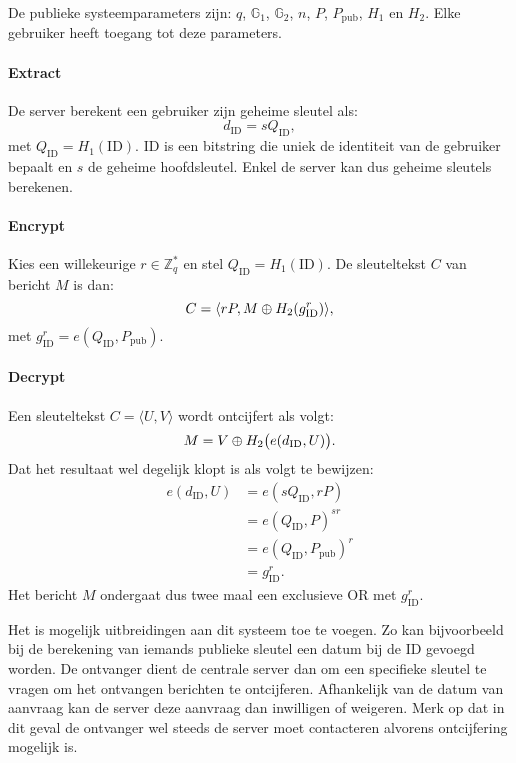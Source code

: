De publieke systeemparameters zijn: $q$, $\mathbb{G}_1$, $\mathbb{G}_2$, $n$, $P$, $P_{\text{pub}}$, $H_1$ en $H_2$. Elke gebruiker heeft toegang tot deze parameters.

\paragraph{Extract} De server berekent een gebruiker zijn geheime sleutel als:
\[d_{\text{ID}} = s Q_{\text{ID}},\]
met $Q_{\text{ID}} = H_1(\text{ID})$. ID is een bitstring die uniek de identiteit van de gebruiker bepaalt en $s$ de geheime hoofdsleutel. Enkel de server kan dus geheime sleutels berekenen.

\paragraph{Encrypt} Kies een willekeurige $r \in \mathbb{Z}_q^*$ en stel $Q_{\text{ID}} = H_1(\text{ID})$. De sleuteltekst $C$ van bericht $M$ is dan:
\[C = \langle rP, M \oplus H_2(g_{\text{ID}}^r) \rangle,\]
met $g_{\text{ID}}^r = e(Q_{\text{ID}}, P_{\text{pub}})$.

\paragraph{Decrypt} Een sleuteltekst $C = \langle U, V \rangle$ wordt ontcijfert als volgt:
\[M = V \oplus H_2\big( e(d_{\text{ID}}, U) \big).\]
Dat het resultaat wel degelijk klopt is als volgt te bewijzen:
\[\begin{aligned}
e(d_{\text{ID}}, U)	&= e(sQ_{\text{ID}}, rP)\\
							&= e(Q_{\text{ID}}, P)^{sr}\\
							&= e(Q_{\text{ID}}, P_{\text{pub}})^r\\
							&= g_{\text{ID}}^r.
\end{aligned}\]
Het bericht $M$ ondergaat dus twee maal een exclusieve OR met $g_{\text{ID}}^r$.

Het is mogelijk uitbreidingen aan dit systeem toe te voegen. Zo kan bijvoorbeeld bij de berekening van iemands publieke sleutel een datum bij de ID gevoegd worden. De ontvanger dient de centrale server dan om een specifieke sleutel te vragen om het ontvangen berichten te ontcijferen. Afhankelijk van de datum van aanvraag kan de server deze aanvraag dan inwilligen of weigeren. Merk op dat in dit geval de ontvanger wel steeds de server moet contacteren alvorens ontcijfering mogelijk is.


